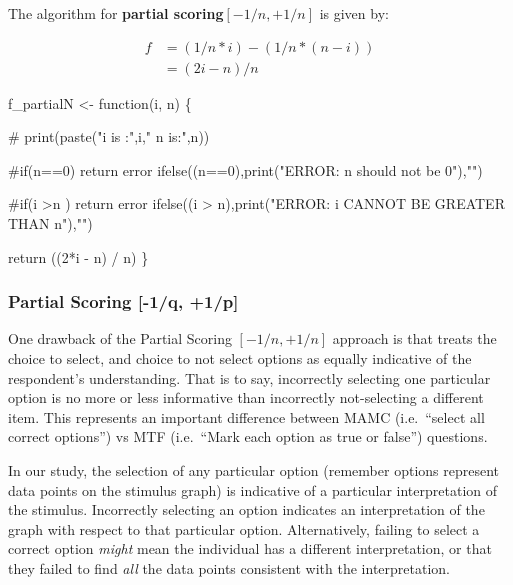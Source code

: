 \documentclass[
  letterpaper,
  DIV=11,
  numbers=noendperiod]{scrreprt}
\newenvironment{Shaded}{\begin{snugshade}}{\end{snugshade}}
\newcommand{\CommentTok}[1]{\textcolor[rgb]{0.37,0.37,0.37}{#1}}
\newcommand{\ControlFlowTok}[1]{\textcolor[rgb]{0.00,0.23,0.31}{#1}}
\newcommand{\DecValTok}[1]{\textcolor[rgb]{0.68,0.00,0.00}{#1}}
\newcommand{\FunctionTok}[1]{\textcolor[rgb]{0.28,0.35,0.67}{#1}}
\newcommand{\NormalTok}[1]{\textcolor[rgb]{0.00,0.23,0.31}{#1}}
\newcommand{\OtherTok}[1]{\textcolor[rgb]{0.00,0.23,0.31}{#1}}
\newcommand{\SpecialCharTok}[1]{\textcolor[rgb]{0.37,0.37,0.37}{#1}}
\newcommand{\StringTok}[1]{\textcolor[rgb]{0.13,0.47,0.30}{#1}}
\begin{document}
The algorithm for \textbf{partial scoring}\([-1/n, +1/n]\) is given by:

\begin{align}
f &= (1/n * i) - (1/n * (n-i)) \\
&= (2i - n)/{n} 
\end{align}

\begin{Shaded}
\begin{Highlighting}[]
\NormalTok{f\_partialN }\OtherTok{\textless{}{-}} \ControlFlowTok{function}\NormalTok{(i, n) \{}

\CommentTok{\# print(paste("i is :",i," n is:",n))}

\CommentTok{\#if(n==0) return error}
\FunctionTok{ifelse}\NormalTok{((n}\SpecialCharTok{==}\DecValTok{0}\NormalTok{),}\FunctionTok{print}\NormalTok{(}\StringTok{"ERROR: n should not be 0"}\NormalTok{),}\StringTok{""}\NormalTok{)}

\CommentTok{\#if(i \textgreater{}n ) return error}
\FunctionTok{ifelse}\NormalTok{((i }\SpecialCharTok{\textgreater{}}\NormalTok{ n),}\FunctionTok{print}\NormalTok{(}\StringTok{"ERROR: i CANNOT BE GREATER THAN n"}\NormalTok{),}\StringTok{""}\NormalTok{)}

\FunctionTok{return}\NormalTok{ ((}\DecValTok{2}\SpecialCharTok{*}\NormalTok{i }\SpecialCharTok{{-}}\NormalTok{ n) }\SpecialCharTok{/}\NormalTok{ n) }
\NormalTok{\}}
\end{Highlighting}
\end{Shaded}

\hypertarget{partial-scoring--1q-1p}{%
\subsubsection{Partial Scoring {[}-1/q,
+1/p{]}}\label{partial-scoring--1q-1p}}

One drawback of the Partial Scoring \([-1/n, +1/n]\) approach is that
treats the choice to select, and choice to not select options as equally
indicative of the respondent's understanding. That is to say,
incorrectly selecting one particular option is no more or less
informative than incorrectly not-selecting a different item. This
represents an important difference between MAMC (i.e.~``select all
correct options'') vs MTF (i.e.~``Mark each option as true or false'')
questions.

In our study, the selection of any particular option (remember options
represent data points on the stimulus graph) is indicative of a
particular interpretation of the stimulus. Incorrectly selecting an
option indicates an interpretation of the graph with respect to that
particular option. Alternatively, failing to select a correct option
\emph{might} mean the individual has a different interpretation, or that
they failed to find \emph{all} the data points consistent with the
interpretation.
\end{document}
